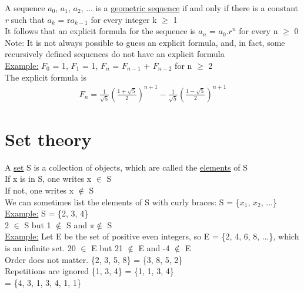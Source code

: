 \documentclass{article}
\begin{document}
A sequence $a_{0}$, $a_{1}$, $a_{2}$, ... is a \underline{geometric sequence} if and only if there is a constant \textit{r} such that 
$a_{k}$ = r$a_{k-1}$ for every integer k $\geq$ 1 \\

It follows that an explicit formula for the sequence is $a_{n}$ = $a_{0}.r^{n}$ for every n $\geq$ 0 \\

Note: It is not always possible to guess an explicit formula, and, in fact, some recursively defined sequences do not have
an explicit formula \\ 

\underline{Example:} $F_{0}$ = 1, $F_{1}$ = 1, $F_{n}$ = $F_{n-1}$ + $F_{n-2}$ for n $\geq$ 2 \\

The explicit formula is
\begin{align}
F_{n} = \frac{1}{\sqrt{5}} ( \frac{1+\sqrt{5}}{2} )^{n+1} - \frac{1}{\sqrt{5}} ( \frac{1-\sqrt{5}}{2} )^{n+1}
\end{align}

\section{Set theory}

A \underline{set} S is a collection of objects, which are called the \underline{elements} of S \\

If x is in S, one writes x $\in$ S \\

If not, one writes x $\notin$ S \\

We can sometimes list the elements of S with curly braces: S = \{$x_{1}$, $x_{2}$, ...\} \\

\underline{Example:} S = \{2, 3, 4\} \\

2 $\in$ S but 1 $\notin$ S and $\pi \notin$ S \\

\underline{Example:} Let E be the set of positive even integers, so E = \{2, 4, 6, 8, ...\}, which is an infinite set. 20 $\in$ E but
21 $\notin$ E and -4 $\notin$ E \\

Order does not matter. \{2, 3, 5, 8\} = \{3, 8, 5, 2\} \\

Repetitions are ignored \{1, 3, 4\} = \{1, 1, 3, 4\} \\
= \{4, 3, 1, 3, 4, 1, 1\} \\
\end{document}

